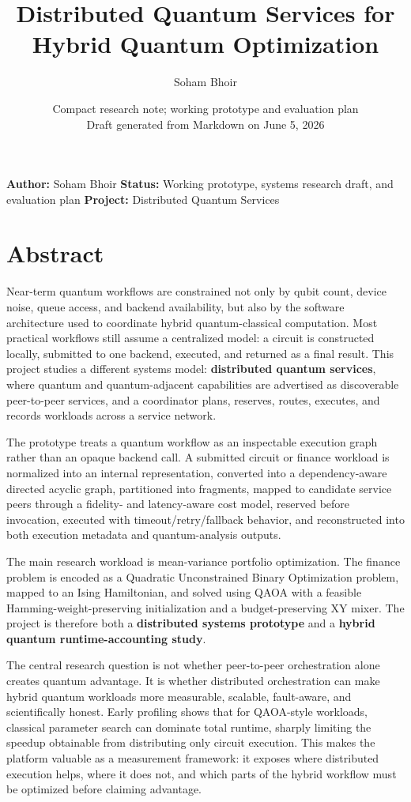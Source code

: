 \documentclass[11pt]{article}
\title{Distributed Quantum Services for Hybrid Quantum Optimization}
\author{Soham Bhoir}
\date{Compact research note; working prototype and evaluation plan\\Draft generated from Markdown on June 5, 2026}
\begin{document}
\maketitle

\textbf{Author:} Soham Bhoir \textbf{Status:} Working prototype, systems research draft, and evaluation plan \textbf{Project:} Distributed Quantum Services

\section{Abstract}

Near-term quantum workflows are constrained not only by qubit count, device noise, queue access, and backend availability, but also by the software architecture used to coordinate hybrid quantum-classical computation. Most practical workflows still assume a centralized model: a circuit is constructed locally, submitted to one backend, executed, and returned as a final result. This project studies a different systems model: \textbf{distributed quantum services}, where quantum and quantum-adjacent capabilities are advertised as discoverable peer-to-peer services, and a coordinator plans, reserves, routes, executes, and records workloads across a service network.

The prototype treats a quantum workflow as an inspectable execution graph rather than an opaque backend call. A submitted circuit or finance workload is normalized into an internal representation, converted into a dependency-aware directed acyclic graph, partitioned into fragments, mapped to candidate service peers through a fidelity- and latency-aware cost model, reserved before invocation, executed with timeout/retry/fallback behavior, and reconstructed into both execution metadata and quantum-analysis outputs.

The main research workload is mean-variance portfolio optimization. The finance problem is encoded as a Quadratic Unconstrained Binary Optimization problem, mapped to an Ising Hamiltonian, and solved using QAOA with a feasible Hamming-weight-preserving initialization and a budget-preserving XY mixer. The project is therefore both a \textbf{distributed systems prototype} and a \textbf{hybrid quantum runtime-accounting study}.

The central research question is not whether peer-to-peer orchestration alone creates quantum advantage. It is whether distributed orchestration can make hybrid quantum workloads more measurable, scalable, fault-aware, and scientifically honest. Early profiling shows that for QAOA-style workloads, classical parameter search can dominate total runtime, sharply limiting the speedup obtainable from distributing only circuit execution. This makes the platform valuable as a measurement framework: it exposes where distributed execution helps, where it does not, and which parts of the hybrid workflow must be optimized before claiming advantage.
\end{document}
